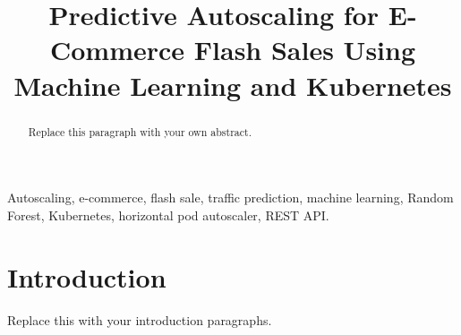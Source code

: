 \documentclass[conference]{IEEEtran}
\begin{document}
\title{Predictive Autoscaling for E-Commerce Flash Sales Using Machine Learning and Kubernetes\\
}


\author{
}

\maketitle

\begin{abstract}
Replace this paragraph with your own abstract.
\end{abstract}

\begin{IEEEkeywords}
Autoscaling, e-commerce, flash sale, traffic prediction, machine learning, Random Forest, Kubernetes, horizontal pod autoscaler, REST API.
\end{IEEEkeywords}

\section{Introduction}
\label{sec:intro}
Replace this with your introduction paragraphs.
\end{document}

